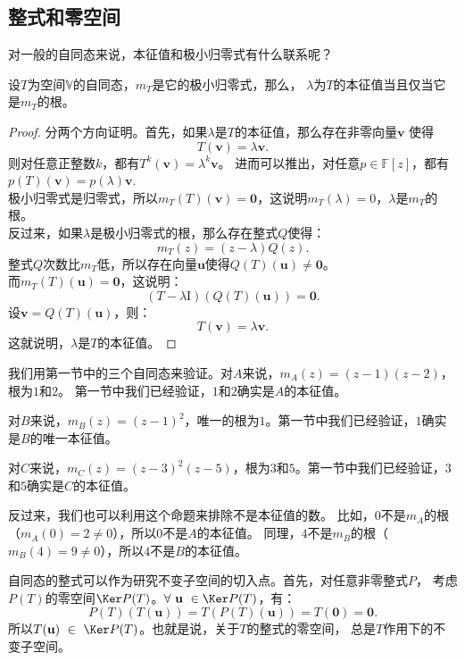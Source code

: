 \documentclass[12pt,UTF8,fontset=none]{ctexbook}
\begin{document}
\subsection{整式和零空间}
对一般的自同态来说，本征值和极小归零式有什么联系呢？
\begin{pp}\label{pp:6_3}
    设$T$为空间$\mathbb{V}$的自同态，$m_T$是它的极小归零式，那么，
    $\lambda$为$T$的本征值当且仅当它是$m_T$的根。
\end{pp}
\begin{proof} %
    分两个方向证明。首先，如果$\lambda$是$T$的本征值，那么存在非零向量$\mathbf{v}$
    使得
    $$ T(\mathbf{v}) = \lambda \mathbf{v}.$$
    则对任意正整数$k$，都有$T^k(\mathbf{v}) = \lambda^k \mathbf{v}$。
    进而可以推出，对任意$p\in\mathbb{F}[z]$，都有$p(T)(\mathbf{v}) = p(\lambda) \mathbf{v}.$\\
    极小归零式是归零式，所以$m_T(T)(\mathbf{v}) = \mathbf{0}$，这说明$m_T(\lambda) = 0$，$\lambda$是$m_T$的根。\\
    反过来，如果$\lambda$是极小归零式的根，那么存在整式$Q$使得：
    $$ m_T(z) = (z - \lambda)Q(z).$$
    整式$Q$次数比$m_T$低，所以存在向量$\mathbf{u}$使得$Q(T)(\mathbf{u}) \neq \mathbf{0}$。\\
    而$m_T(T)(\mathbf{u}) = \mathbf{0}$，这说明：
    $$ (T - \lambda \mathrm{I})(Q(T)(\mathbf{u})) = \mathbf{0}.$$
    设$\mathbf{v} = Q(T)(\mathbf{u})$，则：
    $$ T(\mathbf{v}) = \lambda \mathbf{v}.$$
    这就说明，$\lambda$是$T$的本征值。

\end{proof}

我们用第一节中的三个自同态来验证。对$A$来说，$m_A(z) = (z-1)(z-2)$，根为$1$和$2$。
第一节中我们已经验证，$1$和$2$确实是$A$的本征值。

对$B$来说，$m_B(z) = (z-1)^2$，唯一的根为$1$。第一节中我们已经验证，$1$确实是$B$的唯一本征值。

对$C$来说，$m_C(z) = (z-3)^2(z-5)$，根为$3$和$5$。第一节中我们已经验证，$3$和$5$确实是$C$的本征值。

反过来，我们也可以利用这个命题来排除不是本征值的数。
比如，$0$不是$m_A$的根（$m_A(0) = 2 \neq 0$），所以$0$不是$A$的本征值。
同理，$4$不是$m_B$的根（$m_B(4) = 9 \neq 0$），所以$4$不是$B$的本征值。

自同态的整式可以作为研究不变子空间的切入点。首先，对任意非零整式$P$，
考虑$P(T)$的零空间$\Ker P(T)$。$\forall \,\, \mathbf{u} \,\, \in \Ker P(T)$，有：
$$ P(T)(T(\mathbf{u})) = T(P(T)(\mathbf{u})) = T(\mathbf{0}) = \mathbf{0}.$$
所以$T(\mathbf{u})\,\,\in\,\,\Ker P(T)$。也就是说，关于$T$的整式的零空间，
总是$T$作用下的不变子空间。
\end{document}
